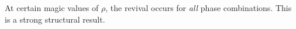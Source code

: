 At certain magic values of $\rho$, the revival occurs for \emph{all}
phase combinations. This is a strong structural result.
